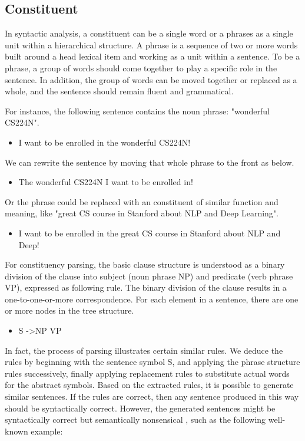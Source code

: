 \documentclass{tufte-handout}
\begin{document}
\subsection{Constituent}
In syntactic analysis, a constituent can be a single word or a phrases as a single unit within a hierarchical structure. A phrase is a sequence of two or more words built around a head lexical item and working as a unit within a sentence. To be a phrase, a group of words should come together to play a specific role in the sentence. In addition, the group of words can be moved together or replaced as a whole, and the sentence should remain fluent and grammatical.

For instance, the following sentence contains the noun phrase: "wonderful CS224N".
\begin{itemize}
\item I want to be enrolled in the wonderful CS224N!
\end{itemize}

We can rewrite the sentence by moving that whole phrase to the front as below.
\begin{itemize}
\item The wonderful CS224N I want to be enrolled in!
\end{itemize}

Or the phrase could be replaced with an constituent of similar function and meaning, like "great CS course in Stanford about NLP and Deep Learning".

\begin{itemize}
\item I want to be enrolled in the great CS course in Stanford about NLP and Deep!
\end{itemize}

For constituency parsing, the basic clause structure is understood as a binary division of the clause into subject (noun phrase NP) and predicate (verb phrase VP), expressed as following rule. The binary division of the clause results in a one-to-one-or-more correspondence. For each element in a sentence, there are one or more nodes in the tree structure.

\begin{itemize}
\item S ->\quad NP \quad VP
\end{itemize}

In fact, the process of parsing illustrates certain similar rules. We deduce the rules by beginning with the sentence symbol S, and applying the phrase structure rules successively, finally applying replacement rules to substitute actual words for the abstract symbols. Based on the extracted rules, it is possible to generate similar sentences. If the rules are correct, then any sentence produced in this way should be syntactically correct. However, the generated sentences might be syntactically correct but semantically nonsensical , such as the following well-known example:
\end{document}
